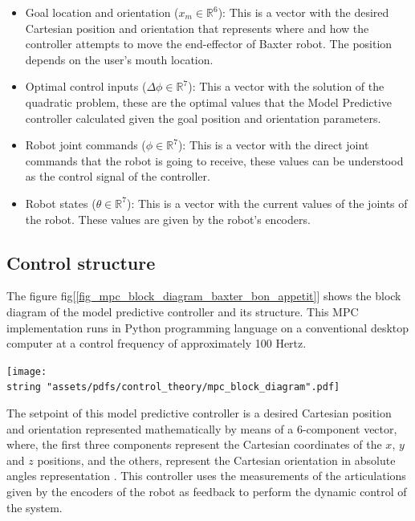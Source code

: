 \documentclass[11pt]{report} %
\begin{document}
\begin{itemize}
    \item Goal location and orientation ($x_{m} \in \mathbb{R}^6$): This is a vector with the desired Cartesian position and orientation that represents where and how the controller attempts to move the end-effector of Baxter robot. The position depends on the user's mouth location. 
    \item Optimal control inputs ($\Delta\phi \in \mathbb{R}^7$): This a vector with the solution of the quadratic problem, these are the optimal values that the Model Predictive controller calculated given the goal position and orientation parameters.
    \item Robot joint commands ($\phi \in \mathbb{R}^7$): This is a vector with the direct joint commands that the robot is going to receive, these values can be understood as the control signal of the controller.
    \item Robot states ($\theta \in \mathbb{R}^7$): This is a vector with the current values of the joints of the robot. These values are given by the robot's encoders.
\end{itemize}

\subsection{Control structure}

The figure fig[\ref{fig_mpc_block_diagram_baxter_bon_appetit}] shows the block diagram of the model predictive controller and its structure. This MPC implementation runs in Python programming language on a conventional desktop computer at a control frequency of approximately 100 Hertz.\\

\begin{center}
\texttt{[image: \\string "assets/pdfs/control\_theory/mpc\_block\_diagram".pdf]}
\bigbreak
\begin{minipage}{\linewidth} %
\label{fig_mpc_block_diagram_baxter_bon_appetit}
\end{minipage} \end{center}

The setpoint of this model predictive controller is a desired Cartesian position and orientation represented mathematically by means of a 6-component vector, where, the first three components represent the Cartesian coordinates of the $x$, $y$ and $z$ positions, and the others, represent the Cartesian orientation in absolute angles representation \citep{cite_craig_robotics}. This controller uses the measurements of the articulations given by the encoders of the robot as feedback to perform the dynamic control of the system.\\
\end{document}
